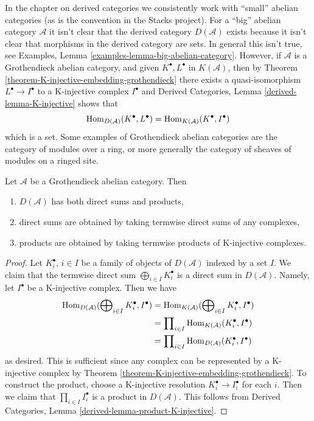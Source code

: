 \begin{remark}
\label{remark-existence-D}
In the chapter on derived categories we consistently work with
``small'' abelian categories (as is the convention in the Stacks
project). For a ``big'' abelian category $\mathcal{A}$ it isn't clear
that the derived category $D(\mathcal{A})$ exists because it isn't
clear that morphisms in the derived category are sets. In general this
isn't true, see
Examples, Lemma \ref{examples-lemma-big-abelian-category}.
However, if $\mathcal{A}$ is a Grothendieck abelian category, and given
$K^\bullet, L^\bullet$ in $K(\mathcal{A})$, then by
Theorem \ref{theorem-K-injective-embedding-grothendieck}
there exists a quasi-isomorphism $L^\bullet \to I^\bullet$ to a
K-injective complex $I^\bullet$ and
Derived Categories, Lemma \ref{derived-lemma-K-injective} shows that
$$
\mathop{\mathrm{Hom}}\nolimits_{D(\mathcal{A})}(K^\bullet, L^\bullet) =
\mathop{\mathrm{Hom}}\nolimits_{K(\mathcal{A})}(K^\bullet, I^\bullet)
$$
which is a set. Some examples of Grothendieck abelian categories
are the category of modules over a ring, or more generally
the category of sheaves of modules on a ringed site.
\end{remark}

\begin{lemma}
\label{lemma-derived-products}
Let $\mathcal{A}$ be a Grothendieck abelian category.
Then
\begin{enumerate}
\item $D(\mathcal{A})$ has both direct sums and products,
\item direct sums are obtained by taking termwise direct sums of
any complexes,
\item products are obtained by taking termwise products of
K-injective complexes.
\end{enumerate}
\end{lemma}

\begin{proof}
Let $K^\bullet_i$, $i \in I$ be a family of objects of $D(\mathcal{A})$
indexed by a set $I$. We claim that the termwise direct sum
$\bigoplus_{i \in I} K^\bullet_i$ is a direct sum in $D(\mathcal{A})$.
Namely, let $I^\bullet$ be a K-injective complex. Then we have
\begin{align*}
\mathop{\mathrm{Hom}}\nolimits_{D(\mathcal{A})}(\bigoplus\nolimits_{i \in I} K^\bullet_i, I^\bullet)
& =
\mathop{\mathrm{Hom}}\nolimits_{K(\mathcal{A})}(\bigoplus\nolimits_{i \in I} K^\bullet_i, I^\bullet) \\
& =
\prod\nolimits_{i \in I} \mathop{\mathrm{Hom}}\nolimits_{K(\mathcal{A})}(K^\bullet_i, I^\bullet) \\
& =
\prod\nolimits_{i \in I} \mathop{\mathrm{Hom}}\nolimits_{D(\mathcal{A})}(K^\bullet_i, I^\bullet)
\end{align*}
as desired. This is sufficient since any complex can be represented
by a K-injective complex by
Theorem \ref{theorem-K-injective-embedding-grothendieck}.
To construct the product, choose a K-injective resolution
$K_i^\bullet \to I_i^\bullet$ for each $i$. Then we claim that
$\prod_{i \in I} I_i^\bullet$ is a product in $D(\mathcal{A})$.
This follows from
Derived Categories, Lemma \ref{derived-lemma-product-K-injective}.
\end{proof}


